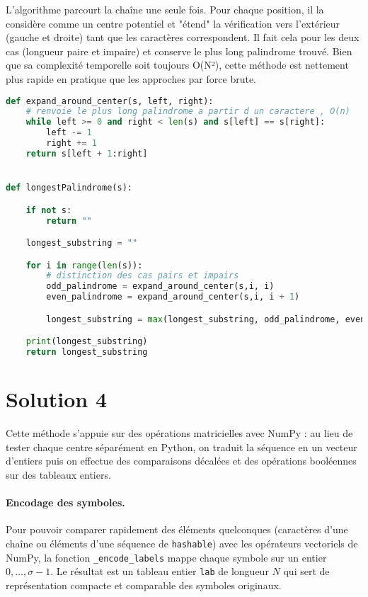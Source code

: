 \documentclass[12pt, a4paper]{article}
\begin{document}
L'algorithme parcourt la chaîne une seule fois. Pour chaque position, il la considère comme un centre potentiel et "étend" la vérification vers l'extérieur (gauche et droite) tant que les caractères correspondent. Il fait cela pour les deux cas (longueur paire et impaire) et conserve le plus long palindrome trouvé. Bien que sa complexité temporelle soit toujours O(N²), cette méthode est nettement plus rapide en pratique que les approches par force brute.
\vspace{2mm}
\begin{lstlisting}[language=Python, label={code:palindrome3}]
def expand_around_center(s, left, right):
    # renvoie le plus long palindrome a partir d un caractere , O(n)
    while left >= 0 and right < len(s) and s[left] == s[right]:
        left -= 1
        right += 1
    return s[left + 1:right]


def longestPalindrome(s):

    if not s:
        return ""

    longest_substring = ""

    for i in range(len(s)):
        # distinction des cas pairs et impairs
        odd_palindrome = expand_around_center(s,i, i)
        even_palindrome = expand_around_center(s,i, i + 1)

        longest_substring = max(longest_substring, odd_palindrome, even_palindrome, key=len)

    print(longest_substring)
    return longest_substring
\end{lstlisting}

\clearpage

\section*{Solution 4}

Cette méthode s'appuie sur des opérations matricielles avec NumPy : au lieu de tester chaque centre séparément en Python, on traduit la séquence en un vecteur d'entiers puis on effectue des comparaisons décalées et des opérations booléennes sur des tableaux entiers.

\paragraph{Encodage des symboles.} Pour pouvoir comparer rapidement des éléments quelconques (caractères d'une chaîne ou éléments d'une séquence de \texttt{hashable}) avec les opérateurs vectoriels de NumPy, la fonction \texttt{\_encode\_labels} mappe chaque symbole sur un entier $0,\dots,\sigma-1$. Le résultat est un tableau entier \texttt{lab} de longueur $N$ qui sert de représentation compacte et comparable des symboles originaux.
\end{document}
